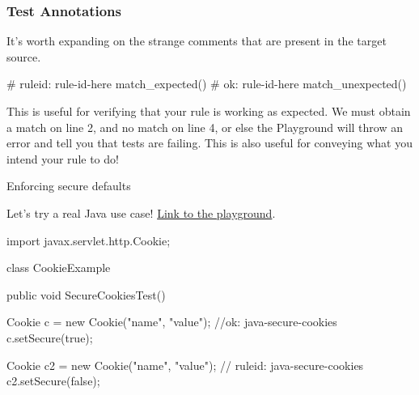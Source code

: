 \documentclass[aspectratio=169, handout]{beamer}
\newenvironment{exercisePage}[1]{
  \begin{minipage}[t][0.4in][t]{\textwidth}
    \Large \term{Exercise:} #1
  \end{minipage}
  \begin{minipage}[t][2in][t]{\textwidth}
}{
  \end{minipage}
}
\begin{document}
\begin{frame}[fragile]
  \frametitle{Test Annotations}

  It's worth expanding on the strange comments that are present in the target source.

  \vspace{\fill}


  \vspace{\fill}

  \begin{pythoncodeblock}
    # ruleid: rule-id-here
    match_expected()
    # ok: rule-id-here
    match_unexpected()
  \end{pythoncodeblock}

  \vspace{\fill}

  This is useful for verifying that your rule is working as expected. We must
  obtain a match on line 2, and no match on line 4, or else the Playground will throw
  an error and tell you that tests are failing. This is also useful for conveying
  what you intend your rule to do!

\end{frame}

\begin{frame}[fragile]
  \begin{exercisePage}{Enforcing secure defaults}
    Let's try a real Java use case! {\color{blue}\href{https://semgrep.dev/playground/r/6JUvwkA/semgrep.java-secure-cookies}{Link to the playground}}.

    \vspace{5pt}

    {\footnotesize\begin{codeblock}[language=java]
      import javax.servlet.http.Cookie;

      class CookieExample {
          public void SecureCookiesTest(){
              Cookie c = new Cookie("name", "value");
              //ok: java-secure-cookies
              c.setSecure(true);

              Cookie c2 = new Cookie("name", "value");
              // ruleid: java-secure-cookies
              c2.setSecure(false);
          }
      }
    \end{codeblock}
    }
  \end{exercisePage}
\end{frame}

\thankyou
\end{document}
